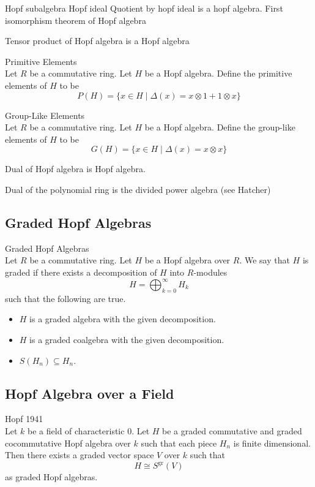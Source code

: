 \documentclass[a4paper]{article}
\begin{document}
Hopf subalgebra
Hopf ideal
Quotient by hopf ideal is a hopf algebra. 
First isomorphism theorem of Hopf algebra

Tensor product of Hopf algebra is a Hopf algebra

\begin{defn}{Primitive Elements}{}\\
Let $R$ be a commutative ring. Let $H$ be a Hopf algebra. Define the primitive elements of $H$ to be $$P(H)=\{x\in H\;|\;\Delta(x)=x\otimes 1+1\otimes x\}$$
\end{defn}

\begin{defn}{Group-Like Elements}{}\\
Let $R$ be a commutative ring. Let $H$ be a Hopf algebra. Define the group-like elements of $H$ to be $$G(H)=\{x\in H\;|\;\Delta(x)=x\otimes x\}$$
\end{defn}

Dual of Hopf algebra is Hopf algebra. 

Dual of the polynomial ring is the divided power algebra (see Hatcher)

\subsection{Graded Hopf Algebras}
\begin{defn}{Graded Hopf Algebras}{}\\
Let $R$ be a commutative ring. Let $H$ be a Hopf algebra over $R$. We say that $H$ is graded if there exists a decomposition of $H$ into $R$-modules $$H=\bigoplus_{k=0}^\infty H_k$$ such that the following are true. 
\begin{itemize}
\item $H$ is a graded algebra with the given decomposition. 
\item $H$ is a graded coalgebra with the given decomposition. 
\item $S(H_n)\subseteq H_n$. 
\end{itemize}
\end{defn}

\subsection{Hopf Algebra over a Field}
\begin{thm}{Hopf 1941}{}\\
Let $k$ be a field of characteristic $0$. Let $H$ be a graded commutative and graded cocommutative Hopf algebra over $k$ such that each piece $H_n$ is finite dimensional. Then there exists a graded vector space $V$ over $k$ such that $$H\cong S^\text{gr}(V)$$ as graded Hopf algebras. 
\end{thm}
\end{document}
